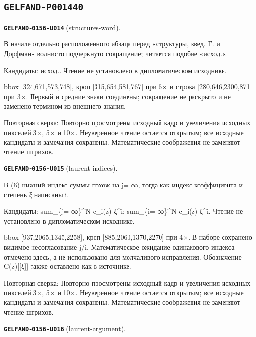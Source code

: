 \subsection*{\texttt{GELFAND-P001440}}
\par\noindent\leavevmode{}\label{GELFAND-0156-U014}\label{GELFAND-P001440:structures-word}\textbf{\texttt{GELFAND-0156-U014}} (structures-word).\nopagebreak[4]\par
В начале отдельно расположенного абзаца перед «структуры, введ. Г. и Дорфман» волнисто подчеркнуто сокращение; читается подобие «исход.».\par
Кандидаты: исход.. Чтение не установлено в дипломатическом исходнике.\par
bbox [324,671,573,748], кроп [315,654,581,767] при 5× и строка [280,646,2300,871] при 3×. Первый и средние знаки соединены; сокращение не раскрыто и не заменено термином из внешнего знания.\par
Повторная сверка: Повторно просмотрены исходный кадр и увеличения исходных пикселей 3×, 5× и 10×. Неуверенное чтение остается открытым; все исходные кандидаты и замечания сохранены. Математические соображения не заменяют чтение штрихов.\par\medskip
\par\noindent\leavevmode{}\label{GELFAND-0156-U015}\label{GELFAND-P001440:laurent-indices}\textbf{\texttt{GELFAND-0156-U015}} (laurent-indices).\nopagebreak[4]\par
В (6) нижний индекс суммы похож на j=-∞, тогда как индекс коэффициента и степень ξ написаны i.\par
Кандидаты: sum\_\{j=-∞\}\textasciicircum{}N c\_i(z) ξ\textasciicircum{}i; sum\_\{i=-∞\}\textasciicircum{}N c\_i(z) ξ\textasciicircum{}i. Чтение не установлено в дипломатическом исходнике.\par
bbox [937,2065,1345,2258], кроп [885,2060,1370,2270] при 4×. В наборе сохранено видимое несогласование j/i. Математическое ожидание одинакового индекса отмечено здесь, а не использовано для молчаливого исправления. Обозначение C(z)[[ξ]] также оставлено как в источнике.\par
Повторная сверка: Повторно просмотрены исходный кадр и увеличения исходных пикселей 3×, 5× и 10×. Неуверенное чтение остается открытым; все исходные кандидаты и замечания сохранены. Математические соображения не заменяют чтение штрихов.\par\medskip
\par\noindent\leavevmode{}\label{GELFAND-0156-U016}\label{GELFAND-P001440:laurent-argument}\textbf{\texttt{GELFAND-0156-U016}} (laurent-argument).\nopagebreak[4]\par
